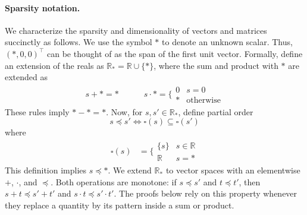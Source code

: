 \documentclass[a4paper,12pt]{article}
\theoremstyle{definition}
\begin{document}
\paragraph{Sparsity notation.}
We characterize the sparsity and dimensionality of vectors and matrices succinctly as follows. We use the symbol $*$ to denote an unknown scalar. Thus, $(*, 0, 0)^\top$ can be thought of as the span of the first unit vector. Formally, define an extension of the reals as $\mathbb{R}_* = \mathbb{R} \cup \{*\}$, where the sum and product with $*$ are extended as 
\begin{align*}
    s + * = * \quad\quad\quad
    s \cdot * = \bigg\{ \begin{array}{cr} 0 & s = 0 \\ * & \text{otherwise}  \end{array}
\end{align*}
These rules imply $* - * = *$. Now, for $s, s' \in \mathbb{R}_*$, define partial order $$s \preceq s' \iff \square(s) \subseteq \square(s')$$ 
where
\begin{align*}
    \square(s) &= \bigg\{ \begin{array}{cr} \{s\} & s \in \mathbb{R} \\ \mathbb{R} & s = * \end{array}
\end{align*}
This definition implies $s \preceq *$. We extend $\mathbb{R}_*$ to vector spaces with an elementwise $+$, $\cdot$, and $\preceq$. Both operations are monotone: if $s \preceq s'$ and $t \preceq t'$, then $s + t \preceq s' + t'$ and $s \cdot t \preceq s' \cdot t'$. The proofs below rely on this property whenever they replace a quantity by its pattern inside a sum or product.
\end{document}
